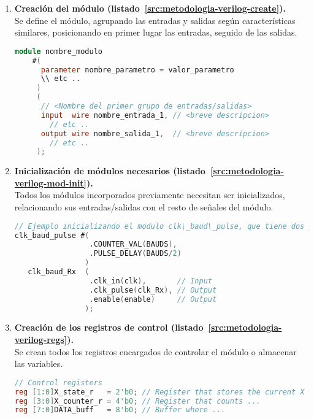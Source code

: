 \begin{enumerate}
    \item{\textbf{Creación del módulo (listado~\ref{src:metodologia-verilog-create}).}} \\
    Se define el módulo, agrupando las entradas y salidas según características similares, posicionando en primer lugar las entradas, seguido de las salidas.
    \begin{lstlisting}[language=Verilog,
        caption={Ejemplo de creación de módulo.},
        label=src:metodologia-verilog-create]
module nombre_modulo
    #(
      parameter nombre_parametro = valor_parametro
      \\ etc ..
     )
     (
      // <Nombre del primer grupo de entradas/salidas>
      input  wire nombre_entrada_1, // <breve descripcion>
        // etc ..
      output wire nombre_salida_1,  // <breve descripcion>
        // etc ..
     );
    \end{lstlisting}
    
    \item{\textbf{Inicialización de módulos necesarios (listado~\ref{src:metodologia-verilog-mod-init}).}} \\
    Todos los módulos incorporados previamente necesitan ser inicializados, relacionando sus entradas/salidas con el resto de señales del módulo.
    \begin{lstlisting}[language=Verilog,
        caption={Ejemplo inicialización de módulos.},
        label=src:metodologia-verilog-mod-init]
// Ejemplo inicializando el modulo clk\_baud\_pulse, que tiene dos parametros, una entrada y dos salidas
clk_baud_pulse #(
                 .COUNTER_VAL(BAUDS),
                 .PULSE_DELAY(BAUDS/2)
                )
   clk_baud_Rx  (
                 .clk_in(clk),       // Input
                 .clk_pulse(clk_Rx), // Output
                 .enable(enable)     // Output
                );
    \end{lstlisting}
    
    \item{\textbf{Creación de los registros de control (listado~\ref{src:metodologia-verilog-regs}).}} \\
    Se crean todos los registros encargados de controlar el módulo o almacenar las variables.
    \begin{lstlisting}[language=Verilog,
        caption={Ejemplo de creación de registros.},
        label=src:metodologia-verilog-regs]
// Control registers
reg [1:0]X_state_r   = 2'b0; // Register that stores the current X state
reg [3:0]X_counter_r = 4'b0; // Register that counts ...
reg [7:0]DATA_buff   = 8'b0; // Buffer where ...
    \end{lstlisting}


\end{enumerate}
